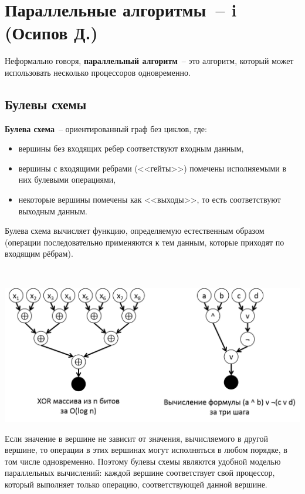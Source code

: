\section{Параллельные алгоритмы~-- i (Осипов Д.)}

Неформально говоря, {\bfseries параллельный алгоритм}~-- это алгоритм, который может использовать несколько процессоров одновременно.
\subsection{Булевы схемы}
\begin{definition*}
	{\bfseries Булева схема}~-- ориентированный граф без циклов, где:
\begin{itemize}
    \item вершины без входящих ребер соответствуют входным данным,
    \item вершины с входящими ребрами (<<гейты>>) помечены исполняемыми в них булевыми операциями,
    \item некоторые вершины помечены как <<выходы>>, то есть соответствуют выходным данным.
\end{itemize}
Булева схема вычисляет функцию, определяемую естественным образом (операции последовательно
применяются к тем данным, которые приходят по входящим рёбрам).
\end{definition*}
\begin{example*}
$ $
    \begin{center}
    \includegraphics[scale=0.5]{figures/boolex.png}
    \end{center}
\end{example*}

Если значение в вершине не зависит от значения, вычисляемого в другой вершине, то
операции в этих вершинах могут исполняться в любом порядке, в том числе одновременно.
Поэтому булевы схемы являются удобной моделью параллельных вычислений:
каждой вершине соответствует свой процессор, который выполняет только операцию, соответствующей данной вершине.

